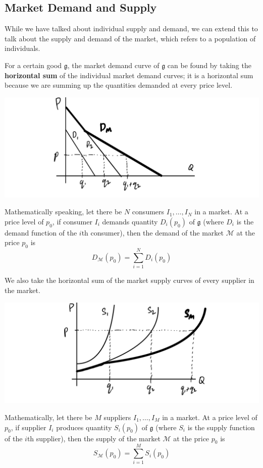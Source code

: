 \documentclass{article}
\begin{document}
  \subsection{Market Demand and Supply}

    While we have talked about individual supply and demand, we can extend this to talk about the supply and demand of the market, which refers to a population of individuals. 

    \begin{definition}
      For a certain good $\mathfrak{g}$, the market demand curve of $\mathfrak{g}$ can be found by taking the \textbf{horizontal sum} of the individual market demand curves; it is a horizontal sum because we are summing up the quantities demanded at every price level. 
      \begin{center}
          \includegraphics[scale=0.27]{img/Market_Demand.PNG}
      \end{center}
      Mathematically speaking, let there be $N$ consumers $I_1, \ldots, I_N$ in a market. At a price level of $p_0$, if consumer $I_i$ demands quantity $D_i (p_0)$ of $\mathfrak{g}$ (where $D_i$ is the demand function of the $i$th consumer), then the demand of the market $\mathcal{M}$ at the price $p_0$ is 
      \[D_\mathcal{M} (p_0) = \sum_{i=1}^N D_i (p_0)\]
    \end{definition}

    \begin{definition}
      We also take the horizontal sum of the market supply curves of every supplier in the market. 
      \begin{center}
          \includegraphics[scale=0.27]{img/Market_Supply.PNG}
      \end{center}
      Mathematically, let there be $M$ suppliers $I_1, \ldots, I_M$ in a market. At a price level of $p_0$, if supplier $I_i$ produces quantity $S_i (p_0)$ of $\mathfrak{g}$ (where $S_i$ is the supply function of the $i$th supplier), then the supply of the market $\mathcal{M}$ at the price $p_0$ is 
      \[S_\mathcal{M} (p_0) = \sum_{i=1}^M S_i (p_0)\]
    \end{definition}
\end{document}
